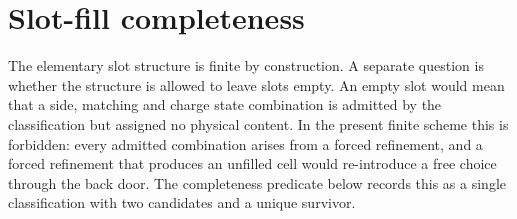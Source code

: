 \documentclass[11pt]{article}
\begin{document}
\begin{code}
%
\>[2]\AgdaSymbol{;}\AgdaSpace{}%
%
\>[34]\AgdaSymbol{=}\AgdaSpace{}%
\<%
\\
%
\>[2]\AgdaSymbol{;}\AgdaSpace{}%
%
\>[34]\AgdaSymbol{=}\AgdaSpace{}%
\<%
\\
%
\>[2]\AgdaSymbol{;}\AgdaSpace{}%
%
\>[34]\AgdaSymbol{=}\AgdaSpace{}%
\<%
\\
%
\>[2]\AgdaSymbol{;}\AgdaSpace{}%
%
\>[34]\AgdaSymbol{=}\AgdaSpace{}%
\<%
\\
%
\>[2]\AgdaSymbol{;}\AgdaSpace{}%
%
\>[34]\AgdaSymbol{=}\AgdaSpace{}%
\<%
\\
%
\>[2]\AgdaSymbol{;}\AgdaSpace{}%
%
\>[34]\AgdaSymbol{=}\AgdaSpace{}%
\<%
\\
%
\>[2]\AgdaSymbol{;}\AgdaSpace{}%
%
\>[34]\AgdaSymbol{=}\AgdaSpace{}%
\<%
\\
%
\>[2]\AgdaSymbol{\}}\<%
\end{code}

\section{Slot-fill completeness}

The elementary slot structure is finite by construction.  A separate
question is whether the structure is allowed to leave slots empty.  An
empty slot would mean that a side, matching and charge state combination
is admitted by the classification but assigned no physical content.  In
the present finite scheme this is forbidden: every admitted combination
arises from a forced refinement, and a forced refinement that produces
an unfilled cell would re-introduce a free choice through the back door.
The completeness predicate below records this as a single classification
with two candidates and a unique survivor.
\end{document}
